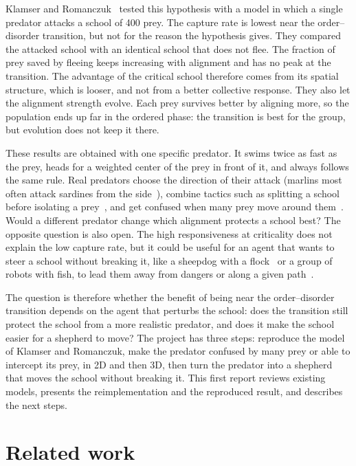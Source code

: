 \documentclass[9pt,twoside]{pnas-new}
\begin{document}
Klamser and Romanczuk~\cite{klamser2021} tested this hypothesis with a model in which a single
predator attacks a school of 400 prey. The capture rate is lowest near the order--disorder
transition, but not for the reason the hypothesis gives. They compared the attacked school with an
identical school that does not flee. The fraction of prey saved by fleeing keeps increasing with
alignment and has no peak at the transition. The advantage of the critical school therefore comes
from its spatial structure, which is looser, and not from a better collective response. They also
let the alignment strength evolve. Each prey survives better by aligning more, so the population ends
up far in the ordered phase: the transition is best for the group, but evolution does not keep it
there.

These results are obtained with one specific predator. It swims twice as fast as the prey, heads for
a weighted center of the prey in front of it, and always follows the same rule. Real predators choose the direction of their attack (marlins most often attack sardines from the
side~\cite{bartashevich2024}), combine tactics such as splitting a school
before isolating a prey~\cite{demsar2015}, and get confused when many prey move around
them~\cite{olson2013}. Would a different predator change which alignment protects a school best? The opposite question is
also open. The high
responsiveness at criticality does not explain the low capture rate, but it could be useful for an
agent that wants to steer a school without breaking it, like a sheepdog with a flock~\cite{strombom2014}
or a group of robots with fish, to lead them away from dangers or along a given
path~\cite{vanhavermaet2023,vanhavermaet2024}.

The question is therefore whether the benefit of being near the order--disorder transition depends
on the agent that perturbs the school: does the transition still protect the school from a more realistic predator, and does it make the school easier for a shepherd to move? The project has three steps: reproduce the model of Klamser and Romanczuk,
make the predator confused by many prey or able to intercept its prey, in 2D and then 3D, then turn the predator into a shepherd that moves
the school without breaking it. This first report
reviews existing models, presents the reimplementation and the reproduced result, and describes the
next steps.

\section*{Related work}
\end{document}

